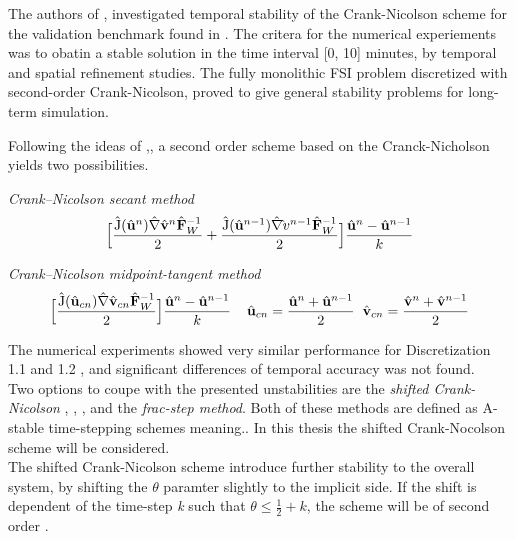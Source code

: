 The authors of \cite{Richter2015}, investigated temporal stability of the Crank-Nicolson scheme for the validation benchmark found in \cite{Hron2006}.  
The critera for the numerical experiements was to obatin a stable solution in the time interval [0, 10] minutes, by temporal and spatial refinement studies. The fully monolithic FSI problem discretized with second-order Crank-Nicolson, proved to give general stability problems for long-term simulation. 

Following the ideas of \cite{Richter2015},, a second order scheme based on the Cranck-Nicholson yields two possibilities.
\begin{discr}
\textit{Crank–Nicolson secant method }
\begin{align*}
\Big[\frac{\text{\^{J}}(\hat{\mathbf{u}}^{n}) \hat{\mathbf{\nabla}} \hat{\mathbf{v}}^{n} \hat{\mathbf{F}}_W^{-1}}{2} 
+ \frac{\text{\^{J}}(\hat{\mathbf{u}}^{n-1}) \hat{\mathbf{\nabla}} \hat{\mathbf{}}v^{n-1} \hat{\mathbf{F}}_W^{-1}}{2} \Big] 
\frac{\hat{\mathbf{u}}^{n} - \hat{\mathbf{u}}^{n-1}}{k}
\end{align*} 
\end{discr}

\begin{discr}
\textit{Crank–Nicolson midpoint-tangent method}
\begin{align*}
\Big[\frac{\text{\^{J}}(\hat{\mathbf{u}}_{cn}) \hat{\mathbf{\nabla}} \hat{\mathbf{v}}_{cn} \hat{\mathbf{F}}_W^{-1}}{2} \Big] 
\frac{\hat{\mathbf{u}}^{n} - \hat{\mathbf{u}}^{n-1}}{k} \hspace{4mm}
\hat{\mathbf{u}}_{cn} = \frac{\hat{\mathbf{u}}^{n} + \hat{\mathbf{u}}^{n-1}}{2} \hspace{2mm}
\hat{\mathbf{v}}_{cn} = \frac{\hat{\mathbf{v}}^{n} + \hat{\mathbf{v}}^{n-1}}{2}
\end{align*} 
\end{discr}

The numerical experiments showed very similar performance for Discretization 1.1 and 1.2 , and significant differences of temporal accuracy was not found. \\
Two options to coupe with the presented unstabilities are the \textit{shifted Crank-Nicolson} \cite{Richter2015}, \cite{Wicka}, \cite{Wick2013a},   and the \textit{frac-step method}. Both of these methods are defined as A-stable time-stepping schemes meaning..  In this thesis the shifted Crank-Nocolson scheme will be considered. \\
The shifted Crank-Nicolson scheme introduce further stability to the overall system, by shifting the $\theta$ paramter slightly to the implicit side. If the shift is dependent of the time-step \textit{k} such that $\theta \leq \frac{1}{2} + k$, the scheme will be of second order \cite{Richter2015}.




